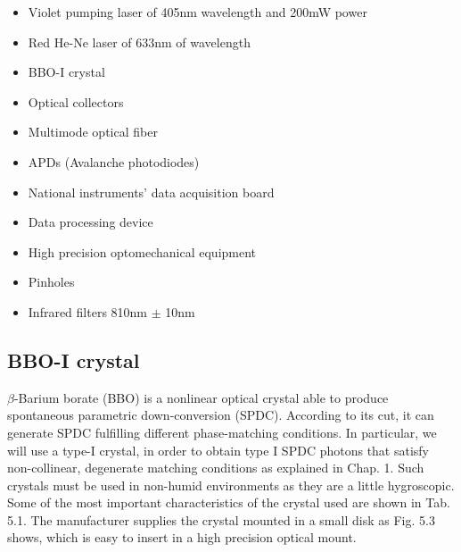 \documentclass[12pt]{book}
\begin{document}
\begin{itemize}



\item Violet pumping laser of 405nm wavelength and 200mW power
\item Red He-Ne laser of 633nm of wavelength
\item BBO-I crystal
\item Optical collectors
\item Multimode optical fiber
\item APDs (Avalanche photodiodes)
\item National instruments' data acquisition board
\item Data processing device
\item High precision optomechanical equipment
\item Pinholes
\item Infrared filters 810nm $\pm$ 10nm
\end{itemize}

\subsection{BBO-I crystal}
$\beta$-Barium borate (BBO) is a nonlinear optical crystal able to produce spontaneous parametric down-conversion (SPDC). According to its cut, it can generate SPDC fulfilling different phase-matching conditions. In particular, we will use a type-I crystal, in order to obtain type I SPDC photons that satisfy non-collinear, degenerate matching conditions as explained in Chap. 1. Such crystals must be used in non-humid environments as they are a little hygroscopic. Some of the most important characteristics of the crystal used are shown in Tab. 5.1. The manufacturer supplies the crystal mounted in a small disk as Fig. 5.3 shows, which is easy to insert in a high precision optical mount.
 
\end{document}
